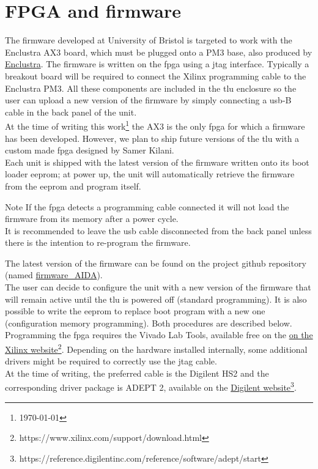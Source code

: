 \section{FPGA and firmware}\label{ch:fpgahardware}
The firmware developed at University of Bristol is targeted to work with the Enclustra  AX3 board, which must be plugged onto a PM3 base, also produced by \href{http://www.enclustra.com/en/home/}{Enclustra}. The firmware is written on the \gls{fpga} using a \gls{jtag} interface. Typically a breakout board will be required to connect the Xilinx programming cable to the Enclustra PM3. All these components are included in the \gls{tlu} enclosure so the user can upload a new version of the firmware by simply connecting a \gls{usb}-B cable in the back panel of the unit.\\
At the time of writing this work\footnote{\monthyeardate\today} the AX3 is the only \gls{fpga} for which a firmware has been developed. However, we plan to ship future versions of the \gls{tlu} with a custom made \gls{fpga} designed by Samer Kilani.\\
Each unit is shipped with the latest version of the firmware written onto its boot loader \gls{eeprom}; at power up, the unit will automatically retrieve the firmware from the \gls{eeprom} and program itself.
\begin{alertinfo}{Note}
    If the \gls{fpga} detects a programming cable connected it will not load the firmware from its memory after a power cycle.\\
    It is recommended to leave the \gls{usb} cable disconnected from the back panel unless there is the intention to re-program the firmware.
\end{alertinfo}
The latest version of the firmware can be found on the project github repository (named \href{https://github.com/PaoloGB/firmware_AIDA}{firmware\_AIDA}).\\
The user can decide to configure the unit with a new version of the firmware that will remain active until the \gls{tlu} is powered off (standard programming). It is also possible to write the \gls{eeprom} to replace boot program with a new one (configuration memory programming). Both procedures are described below.
Programming the \gls{fpga} requires the Vivado Lab Tools, available free on the \href{https://www.xilinx.com/support/download.html}{on the Xilinx website}\footnote{https://www.xilinx.com/support/download.html}. Depending on the hardware installed internally, some additional drivers might be required to correctly use the \gls{jtag} cable.\\
At the time of writing, the preferred cable is the Digilent HS2 and the corresponding driver package is ADEPT 2, available on the \href{https://reference.digilentinc.com/reference/software/adept/start}{Digilent website}\footnote{https://reference.digilentinc.com/reference/software/adept/start}.

